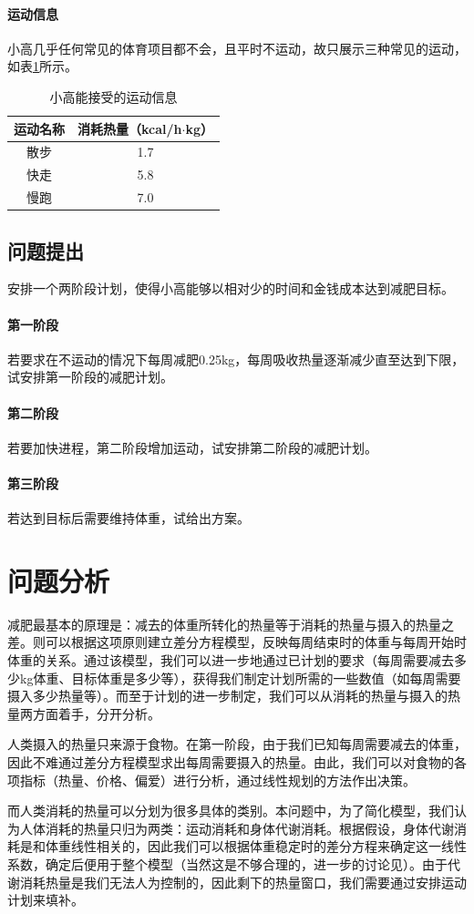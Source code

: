 \documentclass[a4paper,12pt,onecolumn,twoside]{article}
\begin{document}
\paragraph{运动信息~}小高几乎任何常见的体育项目都不会，且平时不运动，故只展示三种常见的运动，如表\ref{sportsinfo}所示。
\begin{table}[H]\label{sportsinfo}
	\centering
	\caption{小高能接受的运动信息}
	\begin{tabular}{c|c} 
		\hline\hline
		运动名称 & 消耗热量\tablefootnote{数据来自网络.}（kcal/h$\cdot$kg） \\\hline
		散步 & 1.7 \\\hline
		快走 & 5.8 \\\hline
		慢跑 & 7.0 \\\hline
		\hline
	\end{tabular}
\end{table}
\subsection*{问题提出}安排一个两阶段计划，使得小高能够以相对少的时间和金钱成本达到减肥目标。
\paragraph{第一阶段~}若要求在不运动的情况下每周减肥0.25kg，每周吸收热量逐渐减少直至达到下限，试安排第一阶段的减肥计划。
\paragraph{第二阶段~}若要加快进程，第二阶段增加运动，试安排第二阶段的减肥计划。
\paragraph{第三阶段~}若达到目标后需要维持体重，试给出方案。
\section{问题分析}
减肥最基本的原理是：减去的体重所转化的热量等于消耗的热量与摄入的热量之差。则可以根据这项原则建立差分方程模型，反映每周结束时的体重与每周开始时体重的关系。通过该模型，我们可以进一步地通过已计划的要求（每周需要减去多少kg体重、目标体重是多少等），获得我们制定计划所需的一些数值（如每周需要摄入多少热量等）。而至于计划的进一步制定，我们可以从消耗的热量与摄入的热量两方面着手，分开分析。\par 
人类摄入的热量只来源于食物。在第一阶段，由于我们已知每周需要减去的体重，因此不难通过差分方程模型求出每周需要摄入的热量。由此，我们可以对食物的各项指标（热量、价格、偏爱）进行分析，通过线性规划的方法作出决策。\par 
而人类消耗的热量可以分划为很多具体的类别。本问题中，为了简化模型，我们认为人体消耗的热量只归为两类：运动消耗和身体代谢消耗。根据假设，身体代谢消耗是和体重线性相关的，因此我们可以根据体重稳定时的差分方程来确定这一线性系数，确定后便用于整个模型（当然这是不够合理的，进一步的讨论见）。由于代谢消耗热量是我们无法人为控制的，因此剩下的热量窗口，我们需要通过安排运动计划来填补。
\end{document}
